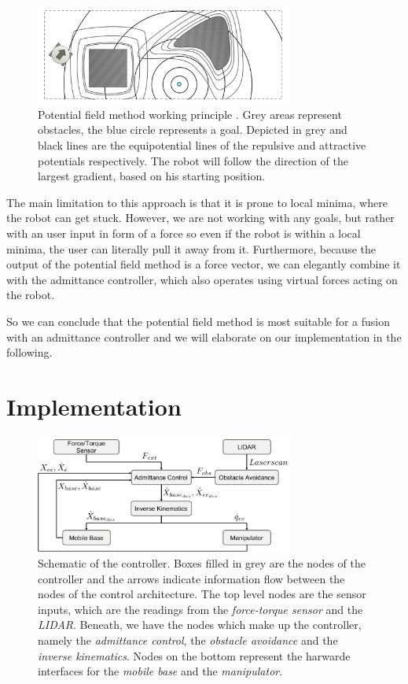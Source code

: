 \begin{figure}[h]
   \centering
   \includegraphics[width=0.75\textwidth]{images/pot_field.png}
   \caption{Potential field method working principle \citep{siegwart2004autonomous}. Grey areas represent obstacles, the blue circle represents a goal. Depicted in grey and black lines are the equipotential lines of the repulsive and attractive potentials respectively. The robot will follow the direction of the largest gradient, based on his starting position.} 
   \label{pics:pot_field}
\end{figure}

The main limitation to this approach is that it is prone to local minima, where the robot can get stuck. However, we are not working with any goals, but rather with an user input in form of a force so even if the robot is within a local minima, the user can literally pull it away from it. Furthermore, because the output of the potential field method is a force vector, we can elegantly combine it with the admittance controller, which also operates using virtual forces acting on the robot. 

So we can conclude that the potential field method is most suitable for a fusion with an admittance controller and we will elaborate on our implementation in the following.

\chapter{Implementation}
\begin{figure}
   \centering
   \includegraphics[width=0.75\textwidth]{images/controller_overview.pdf}
   \caption{Schematic of the controller. Boxes filled in grey are the nodes of the controller and the arrows indicate information flow between the nodes of the control architecture. The top level nodes are the sensor inputs, which are the readings from the \emph{force-torque sensor} and the \emph{LIDAR}. Beneath, we have the nodes which make up the controller, namely the \emph{admittance control}, the \emph{obstacle avoidance} and the \emph{inverse kinematics}. Nodes on the bottom represent the harwarde interfaces for the \emph{mobile base} and the \emph{manipulator}.}
   \label{pics:controller_overview}
\end{figure}

